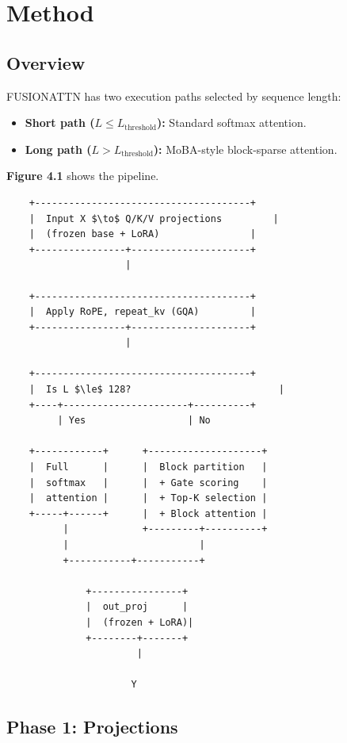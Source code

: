\section{Method}

\subsection{Overview}

FUSIONATTN has two execution paths selected by sequence length:

\begin{itemize}
\item \textbf{Short path ($L \leq L_\text{threshold}$):} Standard softmax attention.
\item \textbf{Long path ($L > L_\text{threshold}$):} MoBA-style block-sparse attention.

\end{itemize}
\textbf{Figure 4.1} shows the pipeline.

\begin{lstlisting}
    +--------------------------------------+
    |  Input X $\to$ Q/K/V projections         |
    |  (frozen base + LoRA)                |
    +----------------+---------------------+
                     |
                      
    +--------------------------------------+
    |  Apply RoPE, repeat_kv (GQA)         |
    +----------------+---------------------+
                     |
                      
    +--------------------------------------+
    |  Is L $\le$ 128?                          |
    +----+----------------------+----------+
         | Yes                  | No
                                 
    +------------+      +--------------------+
    |  Full      |      |  Block partition   |
    |  softmax   |      |  + Gate scoring    |
    |  attention |      |  + Top-K selection |
    +-----+------+      |  + Block attention |
          |             +---------+----------+
          |                       |
          +-----------+-----------+
                       
              +----------------+
              |  out_proj      |
              |  (frozen + LoRA)|
              +--------+-------+
                       |
                        
                      Y
\end{lstlisting}

\subsection{Phase 1: Projections}

